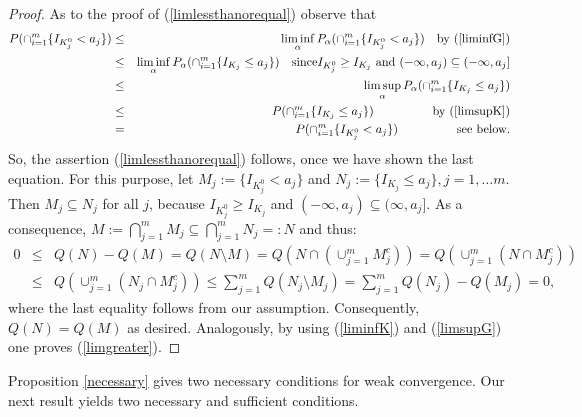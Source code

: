 \documentclass[sn-mathphys,Numbered]{sn-jnl}%
\theoremstyle{thmstyleone}%
\theoremstyle{thmstyletwo}%
\theoremstyle{thmstylethree}%
\begin{document}
\begin{proof} As to the proof of (\ref{limlessthanorequal}) observe that
\begin{eqnarray*}
P(\cap_{i=1}^m \{I_{K_j^0} < a_j\}) &\le& \liminf_\alpha P_\alpha(\cap_{i=1}^m \{I_{K_j^0} < a_j\}) \quad \text{by }(\ref{liminfG})\\
                                    &\le& \liminf_\alpha P_\alpha(\cap_{i=1}^m \{I_{K_j} \le a_j\}) \quad \text{since} I_{K_j^0} \ge I_{K_j} \text{ and } (-\infty,a_j) \subseteq (-\infty,a_j]\\
                                    &\le& \limsup_\alpha P_\alpha(\cap_{i=1}^m \{I_{K_j} \le a_j\})\\
                                    &\le& P(\cap_{i=1}^m \{I_{K_j} \le a_j\}) \hspace{1.7cm} \text{by }(\ref{limsupK})\\
                                    &=&   P(\cap_{i=1}^m \{I_{K_j^0} < a_j\}) \hspace{1.7cm} \text{see below.}
\end{eqnarray*}
So, the assertion (\ref{limlessthanorequal}) follows, once we have shown the last equation. For this purpose, let $M_j:=\{I_{K_j^0} < a_j\}$ and $N_j:=\{I_{K_j} \le a_j\}, j=1,\ldots m$. Then $M_j \subseteq N_j$ for all $j$, because $I_{K_j^0} \ge I_{K_j}$ and $(-\infty,a_j) \subseteq (\infty,a_j]$. As a consequence, $M:=\bigcap_{j=1}^m M_j \subseteq \bigcap_{j=1}^m N_j =: N$ and thus:
\begin{eqnarray*}
0 &\le& Q(N)-Q(M)=  Q(N \setminus M)=Q(N \cap (\cup_{j=1}^m M_j^c))= Q(\cup_{j=1}^m(N \cap M_j^c))\\
  &\le& Q(\cup_{j=1}^m(N_j \cap M_j^c)) \le \sum_{j=1}^m Q(N_j \setminus M_j)= \sum_{j=1}^m Q(N_j)-Q(M_j)=0,
\end{eqnarray*}
where the last equality follows from our assumption. Consequently, $Q(N)=Q(M)$ as desired.
Analogously, by using (\ref{liminfK}) and (\ref{limsupG}) one proves (\ref{limgreater}).
\end{proof}



Proposition \ref{necessary} gives two necessary conditions for weak convergence. Our next result yields two necessary and sufficient conditions.\\
\end{document}
